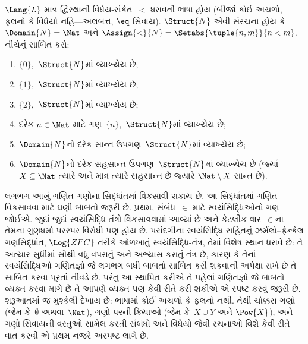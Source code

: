 \begin{prob}
$\Lang{L}$ માત્ર દ્વિસ્થાની વિધેય-સંકેત~$<$ ધરાવતી ભાષા હોય (બીજાં
કોઈ અચળો, ફલનો કે વિધેયો નહિ---અલબત્ત,
$\eq$ સિવાય). $\Struct{N}$ એવી સંરચના હોય કે $\Domain{N}=\Nat$ અને
$\Assign{<}{N}=\Setabs{\tuple{n,m}}{n<m}$. નીચેનું સાબિત કરો:
\begin{enumerate}
\item $\{0\}$,~$\Struct{N}$માં વ્યાખ્યેય છે;
\item $\{1\}$,~$\Struct{N}$માં વ્યાખ્યેય છે;
\item $\{2\}$,~$\Struct{N}$માં વ્યાખ્યેય છે;
\item દરેક $n\in\Nat$ માટે ગણ~$\{n\}$,~$\Struct{N}$માં વ્યાખ્યેય છે;
\item $\Domain{N}$નો દરેક સાન્ત ઉપગણ~$\Struct{N}$માં વ્યાખ્યેય છે;
\item $\Domain{N}$નો દરેક સહસાન્ત ઉપગણ~$\Struct{N}$માં વ્યાખ્યેય છે
  (જ્યાં $X\subseteq\Nat$ ત્યારે અને માત્ર ત્યારે સહસાન્ત છે જ્યારે
  $\Nat\setminus X$ સાન્ત છે).
\end{enumerate}
\end{prob}
\endgroup


\begingroup
\makeatletter{}\makeatother


\label{guunit:OLP-0172}


લગભગ આખું ગણિત ગણોના સિદ્ધાંતમાં વિકસાવી શકાય છે. આ સિદ્ધાંતમાં
ગણિત વિકસાવવા માટે ઘણી બાબતો જરૂરી છે. પ્રથમ, સંબંધ~$\in$ માટે
સ્વયંસિદ્ધિઓનો ગણ જોઈએ. જુદાં જુદાં સ્વયંસિદ્ધિ-તંત્રો વિકસાવવામાં
આવ્યાં છે અને કેટલીક વાર~$\in$ના તેમના ગુણધર્મો પરસ્પર વિરોધી પણ હોય
છે. પસંદગીના સ્વયંસિદ્ધિ સહિતનું ઝર્મેલો--ફ્રેન્કેલ ગણસિદ્ધાંત,
$\Log{ZFC}$ તરીકે ઓળખાતું સ્વયંસિદ્ધિ-તંત્ર, તેમાં વિશેષ સ્થાન ધરાવે
છે: તે અત્યાર સુધીમાં સૌથી વધુ વપરાતું અને અભ્યાસ કરાતું તંત્ર છે,
કારણ કે તેનાં સ્વયંસિદ્ધિઓ ગણિતજ્ઞો જે લગભગ બધી બાબતો સાબિત કરી શકવાની
અપેક્ષા રાખે છે તે સાબિત કરવા પૂરતાં નીવડે છે. પરંતુ આ સ્થાપિત કરીએ તે
પહેલાં ગણિતજ્ઞો જે બાબતો વ્યક્ત કરવા માગે છે તે આપણે વ્યક્ત પણ કેવી
રીતે કરી શકીએ એ સ્પષ્ટ કરવું જરૂરી છે. શરૂઆતમાં જ મુશ્કેલી દેખાય છે:
ભાષામાં કોઈ અચળો કે ફલનો નથી. તેથી ચોક્કસ ગણો (જેમ
કે~$\emptyset$ અથવા~$\Nat$), ગણો પરની ક્રિયાઓ (જેમ કે~$X\cup Y$ અને
$\Pow{X}$), અને ગણો સિવાયની વસ્તુઓ સામેલ કરતી સંબંધો અને વિધેયો જેવી
રચનાઓ વિશે કેવી રીતે વાત કરવી એ પ્રથમ નજરે અસ્પષ્ટ લાગે છે.

